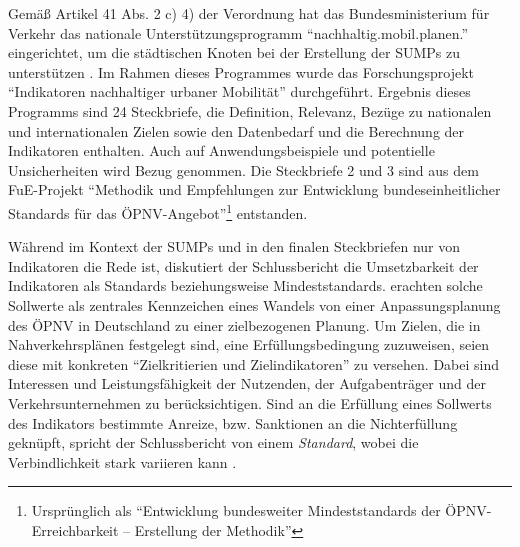\documentclass[11pt,pdftex,a4paper]{scrartcl}
\begin{document}
	Gemäß Artikel 41 Abs. 2 c) 4) der Verordnung hat das Bundesministerium für Verkehr das nationale Unterstützungsprogramm \enquote{nachhaltig.mobil.planen.} eingerichtet, um die städtischen Knoten bei der Erstellung der SUMPs zu unterstützen \parencite{bundesministeriumfuerverkehrNachhaltigeUrbaneMobilitaetsplaene2026}. Im Rahmen dieses Programmes wurde das Forschungsprojekt \enquote{Indikatoren nachhaltiger urbaner Mobilität} durchgeführt. Ergebnis dieses Programms \parencite{bmdvForschungsprojektIndikatorenNachhaltiger2023} sind \num{24} Steckbriefe, die Definition, Relevanz, Bezüge zu nationalen und internationalen Zielen sowie den Datenbedarf und die Berechnung der Indikatoren enthalten. Auch auf Anwendungsbeispiele und potentielle Unsicherheiten wird Bezug genommen. Die Steckbriefe 2 und 3 \parencite[25--30: \enquote{Erschließungsqualität im öffentlichen Verkehr} und \enquote{Erreichbarkeit zentraler Orte}]{bmdvIndikatorenLeichtGemacht2025} sind aus dem FuE-Projekt \enquote{Methodik und Empfehlungen zur
	Entwicklung bundeseinheitlicher
	Standards für das ÖPNV-Angebot}\parencite{kcwgmbhMethodikUndEmpfehlungen2024}\footnote{Ursprünglich als \enquote{Entwicklung bundesweiter Mindeststandards der
	ÖPNV-Erreichbarkeit -- Erstellung der Methodik}\parencite[14]{kcwgmbhMethodikUndEmpfehlungen2024}} entstanden.

	Während im Kontext der SUMPs und in den finalen Steckbriefen nur von Indikatoren die Rede ist, diskutiert der Schlussbericht die Umsetzbarkeit der Indikatoren als Standards beziehungsweise Mindeststandards. \textcite{kirchhoffOPNVPlanungFurLandliche2010} erachten solche Sollwerte als zentrales Kennzeichen eines Wandels von einer Anpassungsplanung des ÖPNV in Deutschland zu einer zielbezogenen Planung. Um Zielen, die in Nahverkehrsplänen festgelegt sind, eine Erfüllungsbedingung zuzuweisen, seien diese mit konkreten \enquote{Zielkritierien und Zielindikatoren} \parencite[14]{kirchhoffOPNVPlanungFurLandliche2010} zu versehen. Dabei sind Interessen und Leistungsfähigkeit der Nutzenden, der Aufgabenträger und der Verkehrsunternehmen zu berücksichtigen. Sind an die Erfüllung eines Sollwerts des Indikators bestimmte Anreize, bzw. Sanktionen an die Nichterfüllung geknüpft, spricht der Schlussbericht von einem \textit{Standard}, wobei die Verbindlichkeit stark variieren kann \parencite[19]{kcwgmbhMethodikUndEmpfehlungen2024}.
	
\end{document}
